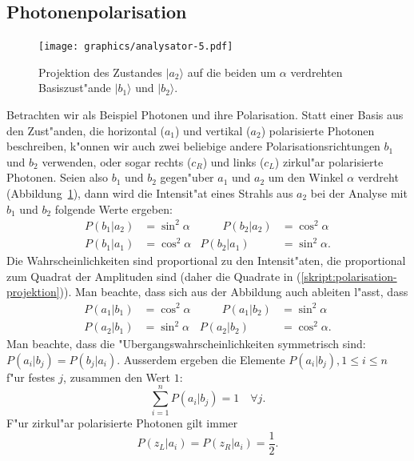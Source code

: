 \subsection{Photonenpolarisation}
\begin{figure}
\centering
\texttt{[image: graphics/analysator-5.pdf]}
\caption{Projektion des Zustandes $|a_2\rangle$ auf die beiden
um $\alpha$ verdrehten Basiszust"ande $|b_1\rangle$ und $|b_2\rangle$.
\label{skript:polarisation-rotation}}
\end{figure}
%
Betrachten wir als Beispiel Photonen und ihre Polarisation. 
Statt einer Basis aus den Zust"anden, die horizontal ($a_1$) und vertikal
($a_2$) polarisierte Photonen beschreiben, k"onnen wir auch zwei 
beliebige andere Polarisationsrichtungen $b_1$ und $b_2$ verwenden,
oder sogar rechts ($c_R$) und links ($c_L$) zirkul"ar polarisierte Photonen.
Seien also $b_1$ und $b_2$ gegen"uber $a_1$ und $a_2$ um den Winkel
$\alpha$ verdreht (Abbildung~\ref{skript:polarisation-rotation}),
dann wird die Intensit"at eines Strahls aus $a_2$
bei der Analyse mit $b_1$ und $b_2$ folgende Werte ergeben:
\begin{equation}
\begin{aligned}
P(b_1|a_2)&=\sin^2\alpha
&\qquad
P(b_2|a_2)&=\cos^2\alpha
\\
P(b_1|a_1)&=\cos^2\alpha
&
P(b_2|a_1)&=\sin^2\alpha.
\end{aligned}
\label{skript:polarisation-projektion}
\end{equation}
Die Wahrscheinlichkeiten sind proportional zu den Intensit"aten,
die proportional zum Quadrat der Amplituden sind (daher die Quadrate
in (\ref{skript:polarisation-projektion})).
Man beachte, dass sich aus der Abbildung auch ableiten l"asst, dass
\begin{equation}
\begin{aligned}
P(a_1|b_1)&=\cos^2\alpha
&\qquad
P(a_1|b_2)&=\sin^2\alpha
\\
P(a_2|b_1)&=\sin^2\alpha
&
P(a_2|b_2)&=\cos^2\alpha.
\end{aligned}
\label{skript:polarisation-projektion-inverse}
\end{equation}
Man beachte, dass die "Ubergangswahrscheinlichkeiten
symmetrisch sind: $P(a_i|b_j)=P(b_j|a_i)$.
Ausserdem ergeben die Elemente $P(a_i|b_j), 1\le i\le n$ f"ur festes $j$,
zusammen den Wert $1$:
\[
\sum_{i=1}^nP(a_i|b_j)=1\quad\forall j.
\]
F"ur zirkul"ar polarisierte Photonen gilt immer 
\[
P(z_L|a_i)=P(z_R|a_i)=\frac12.
\]
